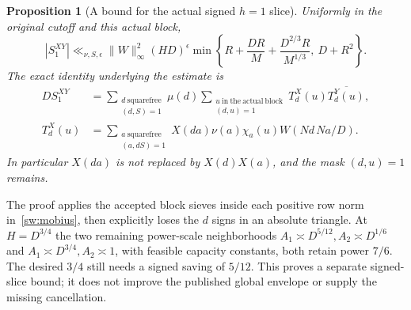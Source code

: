 \documentclass[11pt]{article}
\newtheorem{proposition}[theorem]{Proposition}
\theoremstyle{definition}\newtheorem{definition}[theorem]{Definition}
\theoremstyle{remark}\newtheorem{remark}[theorem]{Remark}
\begin{document}
\begin{proposition}[A bound for the actual signed $h=1$ slice]\label{sw:budget}
Uniformly in the original cutoff and this actual block,
\begin{equation}\label{sw:bound}
 |S_1^{XY}|\ll_{\nu,S,\epsilon}\|W\|_\infty^2(HD)^\epsilon
 \min\left\{R+\frac{DR}{M}+\frac{D^{2/3}R}{M^{1/3}},\ D+R^2\right\}.
\end{equation}
The exact identity underlying the estimate is
\begin{equation}\label{sw:mobius}
 \begin{aligned}
 DS_1^{XY}&=\sum_{\substack{d\ \mathrm{squarefree}\\(d,S)=1}}\mu(d)
 \sum_{\substack{u\ \mathrm{in\ the\ actual\ block}\\(d,u)=1}}
 T_d^X(u)\overline{T_d^Y(u)},\\
 T_d^X(u)&=\sum_{\substack{a\ \mathrm{squarefree}\\(a,dS)=1}}
 X(da)\nu(a)\chi_a(u)W(Nd\,Na/D).
 \end{aligned}
\end{equation}
In particular $X(da)$ is not replaced by $X(d)X(a)$, and the mask
$(d,u)=1$ remains.
\end{proposition}
The proof applies the accepted block sieves inside each positive row norm
in~\eqref{sw:mobius}, then explicitly loses the $d$ signs in an absolute
triangle. At $H=D^{3/4}$ the two remaining power-scale neighborhoods
$A_1\asymp D^{5/12},A_2\asymp D^{1/6}$ and
$A_1\asymp D^{3/4},A_2\asymp1$, with feasible capacity constants, both
retain power $7/6$. The desired $3/4$ still needs a signed saving of
$5/12$. This proves a separate signed-slice bound; it does not improve the
published global envelope or supply the missing cancellation.
\end{document}
